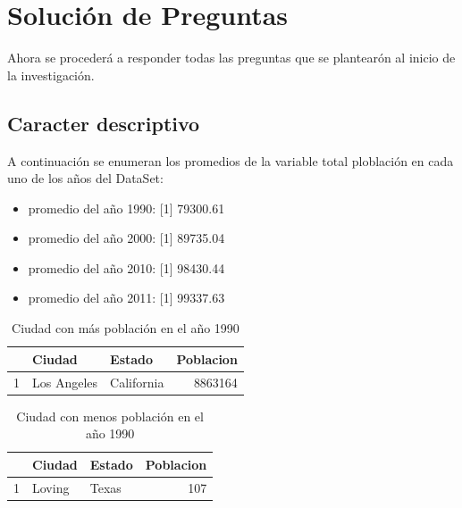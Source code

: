 \section{Solución de Preguntas}
Ahora se procederá a responder todas las preguntas que se plantearón al inicio de la investigación.



\subsection{Caracter descriptivo}

A continuación se enumeran los promedios de la variable total ploblación en cada uno de los años del DataSet:
\begin{itemize}
\item promedio del año 1990:
[1] 79300.61

\item promedio del año 2000:
[1] 89735.04

\item promedio del año 2010:
[1] 98430.44

\item promedio del año 2011:
[1] 99337.63

\end{itemize}

\begin{table}[ht]
\centering
\begin{tabular}{rllr}
  \hline
 & Ciudad & Estado & Poblacion \\ 
  \hline
1 & Los Angeles & California & 8863164 \\ 
   \hline
\end{tabular}
\caption{Ciudad con más población en el año 1990} 
\end{table}


\begin{table}[ht]
\centering
\begin{tabular}{rllr}
  \hline
 & Ciudad & Estado & Poblacion \\ 
  \hline
1 & Loving & Texas & 107 \\ 
   \hline
\end{tabular}
\caption{Ciudad con menos población en el año 1990} 
\end{table}


